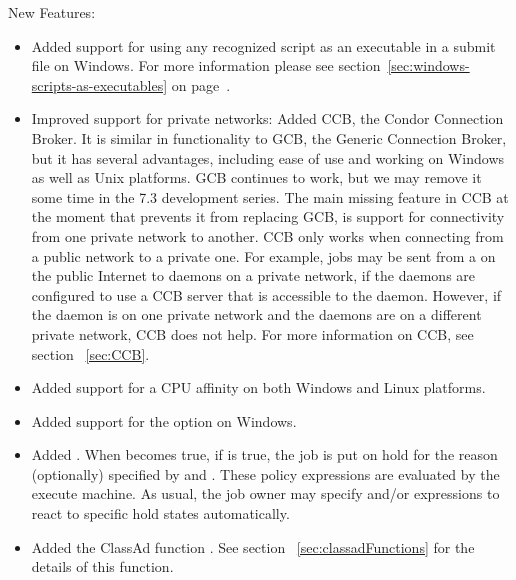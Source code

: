 \noindent New Features:

\begin{itemize}

\item Added support for using any recognized script as an executable
in a submit file on Windows. For more information please see
section~\ref{sec:windows-scripts-as-executables} on
page~\pageref{sec:windows-scripts-as-executables}.

\item Improved support for private networks:
Added CCB, the Condor Connection Broker.  It is similar in
functionality to GCB, the Generic Connection Broker, but it has
several advantages, including ease of use and working on Windows as
well as Unix platforms.
GCB continues to work, but we may remove
it some time in the 7.3 development series.  The main missing feature
in CCB at the moment that prevents it from replacing GCB,
is support for connectivity from one private network to another.
CCB only works
when connecting from a public network to a private one.  For example,
jobs may be sent from a  on the public Internet to 
 daemons on a
private network, if the  daemons are configured
to use a CCB server that is accessible to the  daemon.
However, if the  daemon is on one private
network and the  daemons are on a different private network,
CCB does not help.  For more information on CCB, see section~ \ref{sec:CCB}.

\item Added support for a CPU affinity on both Windows and Linux platforms.

\item Added support for the   option on Windows.

\item Added .  When  becomes
true, if  is true, the job is put on hold for the
reason (optionally) specified by  and
.  These policy expressions are evaluated
by the execute machine.  As usual, the job owner may specify
 and/or 
expressions to react to specific hold states automatically.

\item Added the ClassAd function .
See section~ \ref{sec:classadFunctions} for the details of this function.


\end{itemize}
